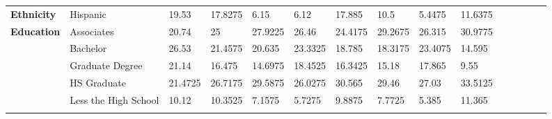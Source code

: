 \documentclass[12pt]{article}
\begin{document}
\begin{table}[]
{\begin{tabular}{lllllllllllllll}
  \textbf{Ethnicity}        & Hispanic                                     & 19.53            & 17.8275         & 6.15              & 6.12             & 17.885           & 10.5              & 5.4475         & 11.6375        &  &  &  &  &  \\
  \textbf{Education}        & Associates                                   & 20.74            & 25              & 27.9225           & 26.46            & 24.4175          & 29.2675           & 26.315         & 30.9775        &  &  &  &  &  \\
                            & Bachelor                                     & 26.53            & 21.4575         & 20.635            & 23.3325          & 18.785           & 18.3175           & 23.4075        & 14.595         &  &  &  &  &  \\
                            & Graduate Degree                              & 21.14            & 16.475          & 14.6975           & 18.4525          & 16.3425          & 15.18             & 17.865         & 9.55           &  &  &  &  &  \\
                            & HS Graduate                                  & 21.4725          & 26.7175         & 29.5875           & 26.0275          & 30.565           & 29.46             & 27.03          & 33.5125        &  &  &  &  &  \\
                            & Less the High School                         & 10.12            & 10.3525         & 7.1575            & 5.7275           & 9.8875           & 7.7725            & 5.385          & 11.365         &  &  &  &  &  \\
                            &                                              &                  &                 &                   &                  &                  &                   &                &                &  &  &  &  & 
  \end{tabular}%
  }
  \end{table}
    
\end{document}
